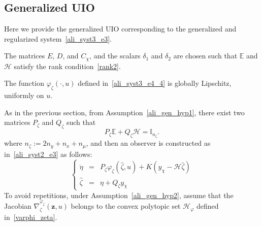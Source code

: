 



\subsection{Generalized UIO}\label{generalized_uio}
Here we provide the generalized UIO corresponding to the generalized and regularized system~\eqref{ali_syst3_e3}.

\begin{assumption}\label{ali_gen_hyp1}
The matrices $E$, $D$, and $C_{\chi}$, and the scalars $\delta_1$ and $\delta_2$ are chosen such that $\mathbb{E}$ and $\mathcal{H}$ satisfy the rank condition~\eqref{rank2}.
\end{assumption}

\begin{assumption}\label{ali_gen_hyp2}
The function $\varphi_{\zeta}(\cdot,u)$ defined in~\eqref{ali_syst3_e4_4} is globally Lipschitz, uniformly on $u$.
\end{assumption}


As in the previous section, from Assumption~\ref{ali_gen_hyp1},  there exist two matrices $P_{\zeta}$ and $Q_{\zeta}$ such that
\begin{equation}\label{ali_syst3_e5'}
 P_{\zeta} \mathbb{E} + Q_{\zeta} \mathcal{H} = \mathbb{I}_{n_{\zeta}}.
\end{equation}
where $n_{\zeta} := 2n_{y} + n_{x} + n_{\mu}$, and then an observer is constructed as in~\eqref{ali_syst2_e3} as follows: 
\begin{equation}\label{ali_syst3_e5}
\left\{
\begin{array}{rcl}
\dot{\eta} & = & P_{\zeta} \varphi_{\zeta}(\hat{\zeta},u) + K \left( y_{\chi} - \mathcal{H} \hat{\zeta} \right)
\\
\hat{\zeta} & = & \eta + Q_{\zeta} y_{\chi} 
\end{array}
\right.
\end{equation}
To avoid repetitions, under Assumption~\ref{ali_gen_hyp2}, assume that the Jacobian $\nabla^{\varphi_{\zeta}}_{\zeta}(\bm{z},u)$ belongs to the convex polytopic set $\mathcal{H}_{\varphi} $ defined in~\eqref{varphi_zeta}.


